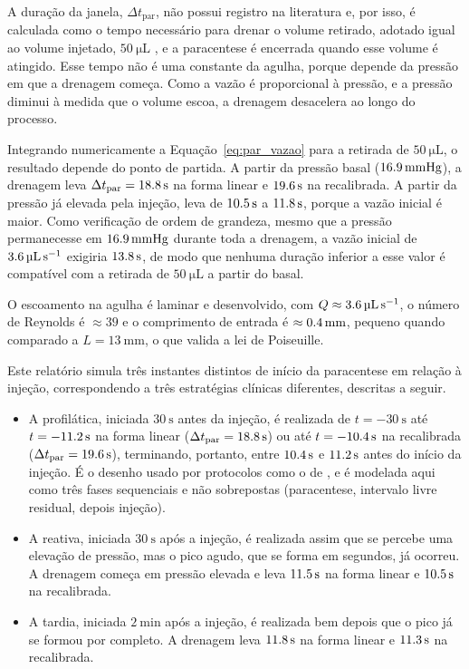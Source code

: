 A duração da janela, $\Delta t_{\text{par}}$, não possui registro na literatura e, por isso, é calculada como o tempo necessário para drenar o volume retirado, adotado igual ao volume injetado, $\SI{50}{\micro\liter}$ \citep{changchung2007, soheilian2017}, e a paracentese é encerrada quando esse volume é atingido. Esse tempo não é uma constante da agulha, porque depende da pressão em que a drenagem começa. Como a vazão é proporcional à pressão, e a pressão diminui à medida que o volume escoa, a drenagem desacelera ao longo do processo.
 
Integrando numericamente a Equação~\ref{eq:par_vazao} para a retirada de $\SI{50}{\micro\liter}$, o resultado depende do ponto de partida. A partir da pressão basal ($\SI{16{,}9}{\milli\meter Hg}$), a drenagem leva $\Delta t_{\text{par}}=\SI{18{,}8}{\second}$ na forma linear e $\SI{19{,}6}{\second}$ na recalibrada. A partir da pressão já elevada pela injeção, leva de $\SI{10{,}5}{\second}$ a $\SI{11{,}8}{\second}$, porque a vazão inicial é maior. Como verificação de ordem de grandeza, mesmo que a pressão permanecesse em $\SI{16{,}9}{\milli\meter Hg}$ durante toda a drenagem, a vazão inicial de $\SI{3{,}6}{\micro\liter\per\second}$ exigiria $\SI{13{,}8}{\second}$, de modo que nenhuma duração inferior a esse valor é compatível com a retirada de $\SI{50}{\micro\liter}$ a partir do basal. 

O escoamento na agulha é laminar e desenvolvido, com $Q\approx\SI{3{,}6}{\micro\liter\per\second}$, o número de Reynolds é $\approx39$ e o comprimento de entrada é $\approx\SI{0{,}4}{\milli\meter}$, pequeno quando comparado a $L = \SI{13}{\milli\meter}$, o que valida a lei de Poiseuille.
 
Este relatório simula três instantes distintos de início da paracentese em relação à injeção, correspondendo a três estratégias clínicas diferentes, descritas a seguir.
 
\begin{itemize}
\item A profilática, iniciada $\SI{30}{\second}$ antes da injeção, é realizada de $t=-\SI{30}{\second}$ até $t=-\SI{11{,}2}{\second}$ na forma linear ($\Delta t_{\text{par}}=\SI{18{,}8}{\second}$) ou até $t=-\SI{10{,}4}{\second}$ na recalibrada ($\Delta t_{\text{par}}=\SI{19{,}6}{\second}$), terminando, portanto, entre $\SI{10{,}4}{\second}$ e $\SI{11{,}2}{\second}$ antes do início da injeção. É o desenho usado por protocolos como o de \citet{soheilian2017}, e é modelada aqui como três fases sequenciais e não sobrepostas (paracentese, intervalo livre residual, depois injeção).
\item A reativa, iniciada $\SI{30}{\second}$ após a injeção, é realizada assim que se percebe uma elevação de pressão, mas o pico agudo, que se forma em segundos, já ocorreu. A drenagem começa em pressão elevada e leva $\SI{11{,}5}{\second}$ na forma linear e $\SI{10{,}5}{\second}$ na recalibrada.
\item A tardia, iniciada $\SI{2}{\minute}$ após a injeção, é realizada bem depois que o pico já se formou por completo. A drenagem leva $\SI{11{,}8}{\second}$ na forma linear e $\SI{11{,}3}{\second}$ na recalibrada.
\end{itemize}
 
